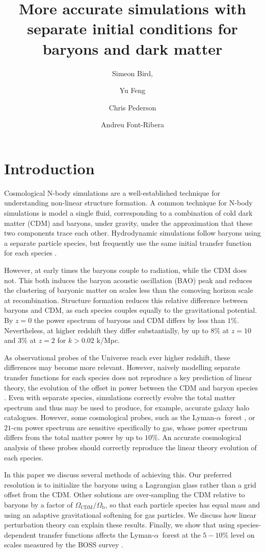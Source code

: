 \documentclass[a4paper,11pt]{article}
\title{More accurate simulations with separate initial conditions for baryons and dark matter}
\author[a,1]{Simeon Bird,\note{Corresponding author}}
\author[b]{Yu Feng}
\author[c]{Chris Pederson}
\author[c]{Andreu Font-Ribera}
\affiliation[a]{Department of Physics \& Astronomy, University of California Riverside,\\ Riverside, CA 92521, USA}
\affiliation[b]{Berkeley Center for Cosmological Physics, University of California Berkeley, \\Berkeley, CA 94720, USA}
\affiliation[c]{Department of Physics \& Astronomy, University College London,\\Gower Street, London WC1E 6BT, UK}
\newcommand{\Lya}{Lyman-$\alpha$}
\begin{document}
\maketitle

\section{Introduction}

Cosmological N-body simulations are a well-established technique for understanding non-linear structure formation. A common technique for N-body simulations is model a single fluid, corresponding to a combination of cold dark matter (CDM) and baryons, under gravity, under the approximation that these two components trace each other. Hydrodynamic simulations follow baryons using a separate particle species, but frequently use the same initial transfer function for each species \cite[e.g.][]{Emberson:2018}.

However, at early times the baryons couple to radiation, while the CDM does not. This both induces the baryon acoustic oscillation (BAO) peak  and reduces the clustering of baryonic matter on scales less than the comoving horizon scale at recombination. Structure formation reduces this relative difference between baryons and CDM, as each species couples equally to the gravitational potential. By $z=0$ the power spectrum of baryons and CDM differs by less than $1\%$. Nevertheless, at higher redshift they differ substantially, by up to $8\%$ at $z=10$ and $3\%$ at $z=2$ for $ k > 0.02$ k/Mpc.

As observational probes of the Universe reach ever higher redshift, these differences may become more relevant. However, naively modelling separate transfer functions for each species does not reproduce a key prediction of linear theory, the evolution of the offset in power between the CDM and baryon species \cite{OLeary:2012, Angulo:2013}. Even with separate species, simulations correctly evolve the total matter spectrum and thus may be used to produce, for example, accurate galaxy halo catalogues. However, some cosmological probes, such as the \Lya~forest \cite{PD2013}, or $21$-cm power spectrum are sensitive specifically to gas, whose power spectrum differs from the total matter power by up to $10\%$. An accurate cosmological analysis of these probes should correctly reproduce the linear theory evolution of each species.

In this paper we discuss several methods of achieving this. Our preferred resolution is to initialize the baryons using a Lagrangian glass rather than a grid offset from the CDM. Other solutions are over-sampling the CDM relative to baryons by a factor of $\Omega_\mathrm{CDM}/\Omega_\mathrm{b}$, so that each particle species has equal mass and using an adaptive gravitational softening for gas particles. We discuss how linear perturbation theory can explain these results. Finally, we show that using species-dependent transfer functions affects the \Lya~forest at the $5-10\%$ level on scales measured by the BOSS survey \cite{PD2013}.
\end{document}
